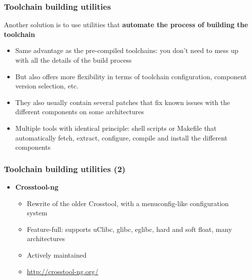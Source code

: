 \begin{frame}
  \frametitle{Toolchain building utilities}
  Another solution is to use utilities that {\bf automate the process of
  building the toolchain}
  \begin{itemize}
  \item Same advantage as the pre-compiled toolchains: you don't need
    to mess up with all the details of the build process
  \item But also offers more flexibility in terms of toolchain
    configuration, component version selection, etc.
  \item They also usually contain several patches that fix known
    issues with the different components on some architectures
  \item Multiple tools with identical principle: shell scripts or
    Makefile that automatically fetch, extract, configure, compile and
    install the different components
\end{itemize}
\end{frame}

\begin{frame}
  \frametitle{Toolchain building utilities (2)}
  \begin{itemize}
  \item {\bf Crosstool-ng}
    \begin{itemize}
    \item Rewrite of the older Crosstool, with a menuconfig-like configuration
      system
    \item Feature-full: supports uClibc, glibc, eglibc, hard and soft
      float, many architectures
    \item Actively maintained
    \item \url{http://crosstool-ng.org/}
    \end{itemize}
  \end{itemize}
\end{frame}

